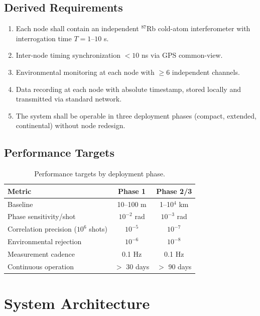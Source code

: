 \documentclass[12pt,a4paper]{article}
\begin{document}
\subsection{Derived Requirements}

\begin{enumerate}[label=\textbf{DR-\arabic*}]
\item Each node shall contain an independent $^{87}$Rb cold-atom
interferometer with interrogation time $T = 1$--$10$ s.
\item Inter-node timing synchronization $< 10$ ns via GPS common-view.
\item Environmental monitoring at each node with $\geq 6$ independent
channels.
\item Data recording at each node with absolute timestamp, stored
locally and transmitted via standard network.
\item The system shall be operable in three deployment phases
(compact, extended, continental) without node redesign.
\end{enumerate}

\subsection{Performance Targets}

\begin{table}[H]
\centering
\begin{tabular}{lcc}
\toprule
\textbf{Metric} & \textbf{Phase 1} & \textbf{Phase 2/3} \\
\midrule
Baseline & 10--100 m & 1--10$^4$ km \\
Phase sensitivity/shot & $10^{-2}$ rad & $10^{-3}$ rad \\
Correlation precision ($10^6$ shots) & $10^{-5}$ & $10^{-7}$ \\
Environmental rejection & $10^{-6}$ & $10^{-8}$ \\
Measurement cadence & 0.1 Hz & 0.1 Hz \\
Continuous operation & $>$ 30 days & $>$ 90 days \\
\bottomrule
\end{tabular}
\caption{Performance targets by deployment phase.}
\label{tab:performance}
\end{table}


\section{System Architecture}\label{sec:architecture}
\end{document}
